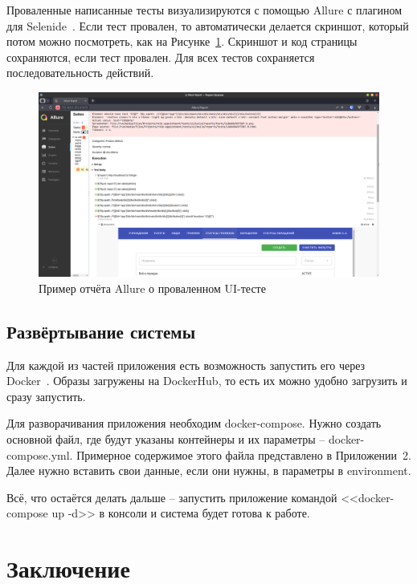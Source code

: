 \documentclass[a4paper,article]{article}
\begin{document}
\begin{sloppypar}
    Проваленные написанные тесты визуализируются с помощью Allure с плагином для Selenide~\cite{allure}. Если тест провален, то автоматически делается скриншот, который потом можно посмотреть, как на Рисунке~\ref{fig:allure}. Скриншот и код страницы сохраняются, если тест провален. Для всех тестов сохраняется последовательность действий.
    
    \begin{figure}[h]
        \centering
        \includegraphics[width=0.8\linewidth]{UI. Отчёт Allure.png}        
        \caption{\centering Пример отчёта Allure о проваленном UI-тесте}        
        \label{fig:allure}
    \end{figure}
    
    \newpage

    \subsection{Развёртывание системы}\label{Реализация. Сборка и развертывание}
    
    Для каждой из частей приложения есть возможность запустить его через Docker~\cite{dockerdoc}. Образы загружены на DockerHub, то есть их можно удобно загрузить и сразу запустить.
    
    Для разворачивания приложения необходим docker-compose. Нужно создать основной файл, где будут указаны контейнеры и их параметры -- docker-compose.yml. Примерное содержимое этого файла представлено в Приложении~2. Далее нужно вставить свои данные, если они нужны, в параметры в environment.
    
    Всё, что остаётся делать дальше -- запустить приложение командой <<docker-compose up -d>> в консоли и система будет готова к работе.

    \newpage

    \section*{Заключение}
    

\end{sloppypar}
\end{document}
